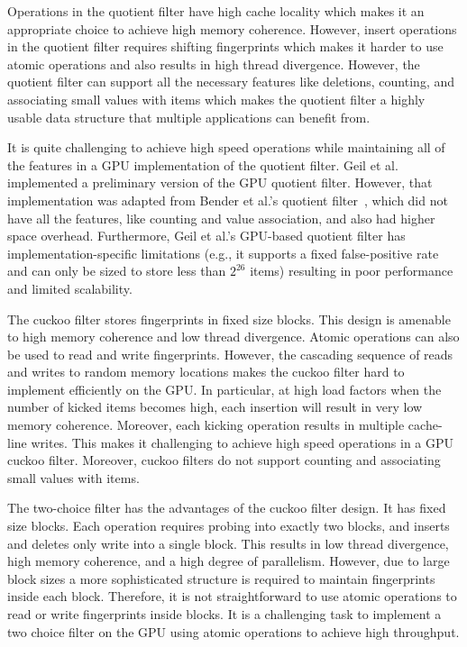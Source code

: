 Operations in the quotient filter have high cache locality which makes it an
appropriate choice to achieve high memory coherence. However, insert operations
in the quotient filter requires shifting fingerprints which makes it harder to
use atomic operations and also results in high thread divergence. However, the
quotient filter can support all the necessary features like deletions, counting,
and associating small values with items which makes the quotient filter a highly
usable data structure that multiple applications can benefit from.

It is quite challenging to achieve high speed operations while maintaining all
of the features in a GPU implementation of the quotient filter. Geil et
al.~\cite{Geil:2018:QFA} implemented a preliminary version of the GPU quotient filter.
However, that implementation was adapted from Bender et al.'s quotient
filter~\cite{BenderFaJo12a}, which did not have all the features, like counting
and value association, and also had higher space overhead. Furthermore, Geil et
al.'s GPU-based quotient filter has implementation-specific limitations (e.g., it
supports a fixed false-positive rate and can only be sized to store less than
$2^{26}$ items) resulting in poor performance and limited scalability.

The cuckoo filter stores fingerprints in fixed size blocks. This design is
amenable to high memory coherence and low thread divergence. Atomic operations
can also be used to read and write fingerprints. However, the cascading sequence
of reads and writes to random memory locations makes the cuckoo filter hard to
implement efficiently on the GPU\@. In particular, at high load factors when the
number of kicked items becomes high, each insertion will result in very low
memory coherence. Moreover, each kicking operation results in multiple
cache-line writes. This makes it challenging to achieve high speed operations in
a GPU cuckoo filter. Moreover, cuckoo filters do not support counting and
associating small values with items.

The two-choice filter has the advantages of the cuckoo filter design. It has
fixed size blocks. Each operation requires probing into exactly two blocks, and
inserts and deletes only write into a single block. This results in low thread
divergence, high memory coherence, and a high degree of parallelism. However,
due to large block sizes a more sophisticated structure is required to maintain
fingerprints inside each block. Therefore, it is not straightforward to use
atomic operations to read or write fingerprints inside blocks. It is a
challenging task to implement a two choice filter on the GPU using atomic
operations to achieve high throughput.

